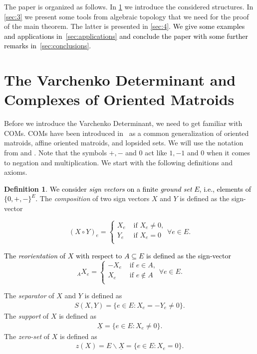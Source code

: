 \documentclass[12pt]{amsart}
\theoremstyle{plain}
\numberwithin{Lemma}{\DefaultNumberTheoremWithin}
\numberwithin{Claim}{\DefaultNumberTheoremWithin}
\numberwithin{Theorem}{\DefaultNumberTheoremWithin}
\numberwithin{Corollary}{\DefaultNumberTheoremWithin}
\numberwithin{Proposition}{\DefaultNumberTheoremWithin}
\numberwithin{Conjecture}{\DefaultNumberTheoremWithin}
\numberwithin{Situation}{\DefaultNumberTheoremWithin}
\numberwithin{Note}{\DefaultNumberTheoremWithin}
\theoremstyle{definition}
\newtheorem{Definition}{Definition}
\numberwithin{Definition}{\DefaultNumberTheoremWithin}
\theoremstyle{definition}
\numberwithin{Question}{\DefaultNumberTheoremWithin}
\theoremstyle{definition}
\numberwithin{Problem}{\DefaultNumberTheoremWithin}
\theoremstyle{remark} \newtheorem{Remark}{Remark}
\numberwithin{Remark}{\DefaultNumberTheoremWithin}
\theoremstyle{remark}
\numberwithin{Example}{\DefaultNumberTheoremWithin}
\numberwithin{Case}{Lemma}
\numberwithin{Step}{Lemma}
\newcommand{\new}[1]{\textcolor{black}{#1}}
\begin{document}
The paper is organized as follows. In \ref{sec:2} we introduce
the considered structures. In \ref{sec:3} we present some 
tools from algebraic topology that we need for the proof of the main
theorem. The latter is presented in \ref{sec:4}. \new{We give some examples and applications in~\ref{sec:applications} and conclude the paper with some further remarks in~\ref{sec:conclusions}.}

\section{The Varchenko Determinant and Complexes of Oriented Matroids} \label{sec:2}
Before we introduce the Varchenko Determinant, we need to get familiar
with COMs. COMs have been introduced
in~\cite{BCK} as a common generalization of oriented matroids, affine
oriented matroids, and lopsided sets. We will use the notation from \cite{BCK} and \cite{thebook}. Note that the symbols $+,-$ and $0$ act like $1,-1$ and $0$ when it comes to negation and multiplication. We start with the following
definitions and axioms.

\begin{Definition} 
\new{We consider \emph{sign vectors} on a finite \emph{ground set} $E$, i.e., elements of $\{0,+,-\}^E$.} The \emph{composition} of two sign vectors $X$ and $Y$ is defined as the sign-vector

$$(X \circ Y)_e = \begin{cases}
                        X_e & \text{ if } X_e \neq 0,\\
                        Y_e & \text{ if } X_e = 0\\
                       \end{cases} 
                    \forall e\in E.$$

\noindent \new{The \emph{reorientation} of $X$ with respect to $A\subseteq E$ is defined as the sign-vector}
$$_AX_e =  \begin{cases}
                        -X_e & \text{ if } e\in A,\\
                        X_e & \text{ if } e\notin A\\
                       \end{cases} 
                    \forall e\in E.$$


\noindent The \emph{separator} of $X$ and $Y$ is defined as
\begin{align*}
S(X,Y) = \{e \in E: X_e = -Y_e \neq 0\}.
\end{align*}
The \emph{support} of $X$ is defined as
\begin{align*}
\underline{X} = \{e \in E: X_e \neq  0\}.
\end{align*}
The \emph{zero-set} of $X$ is defined as
\begin{align*}
z(X) = E\backslash\underline{X} = \{e \in E: X_e =  0\}.
\end{align*}

\end{Definition}
\end{document}
